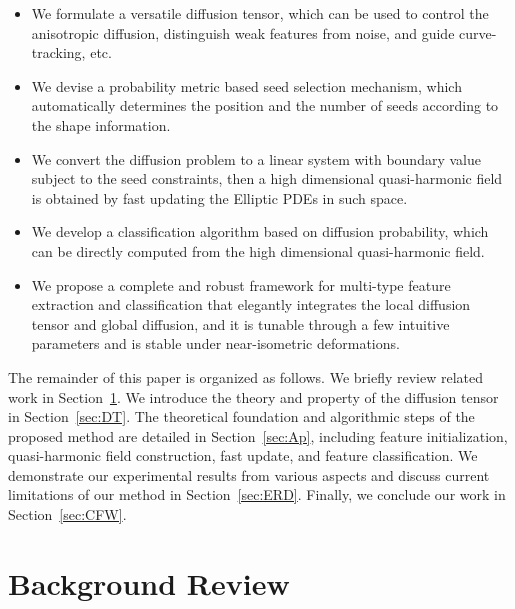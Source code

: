 \documentclass[10pt,journal,cspaper,compsoc]{IEEEtran}
\begin{document}
\begin{itemize}
\item
We formulate a versatile diffusion tensor, which can be used to
control the anisotropic diffusion, distinguish weak features from
noise, and guide curve-tracking, etc.

\item
We devise a probability metric based seed selection mechanism, which
automatically determines the position and the number of seeds
according to the shape information.

\item
We convert the diffusion problem to a linear system with boundary
value subject to the seed constraints, then a high dimensional
quasi-harmonic field is obtained by fast updating the Elliptic PDEs in
such space.

\item
We develop a classification algorithm based on diffusion probability,
which can be directly computed from the high dimensional
quasi-harmonic field.

\item
We propose a complete and robust framework for multi-type feature
extraction and classification that elegantly integrates the local
diffusion tensor and global diffusion, and it is tunable through a few
intuitive parameters and is stable under near-isometric deformations.

\end{itemize}

The remainder of this paper is organized as follows. We briefly review
related work in Section~\ref{sec:related_work}. We introduce the
theory and property of the diffusion tensor in Section~\ref{sec:DT}.
The theoretical foundation and algorithmic steps of the proposed
method are detailed in Section~\ref{sec:Ap}, including feature
initialization, quasi-harmonic field construction, fast update, and
feature classification. We demonstrate our experimental results from
various aspects and discuss current limitations of our method in
Section~\ref{sec:ERD}. Finally, we conclude our work in
Section~\ref{sec:CFW}.

\section{Background Review}
\label{sec:related_work}
\end{document}

